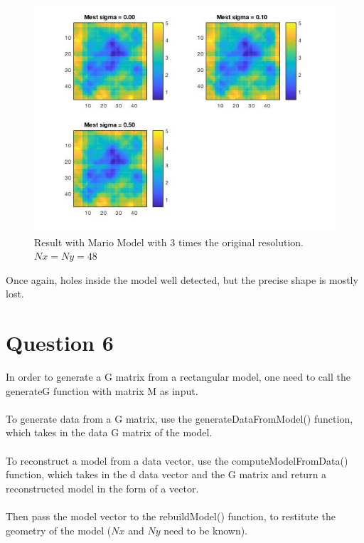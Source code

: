 \documentclass[12pt,a4paper]{extreport}
\begin{document}
\begin{figure}[h]
\includegraphics[width=15cm]{MarioResults3x.jpg} 
\caption{Result with Mario Model with 3 times the original resolution.$Nx=Ny=48$}
\end{figure}
Once again, holes inside the model well detected, but the precise shape is mostly lost.

\newpage
\section{Question 6} 
In order to generate a G matrix from a rectangular model, one need to call the generateG function with matrix M as input.

\paragraph*{}
To generate data from a G matrix, use the generateDataFromModel() function, which takes in the data G matrix of the model.

\paragraph{}
To reconstruct a model from a data vector, use the computeModelFromData() function, which takes in the d data vector and the G matrix and return a reconstructed model in the form of a vector.

\paragraph{}
Then pass the model vector to the rebuildModel() function, to restitute the geometry of the model ($Nx$ and $Ny$ need to be known).
\end{document}
